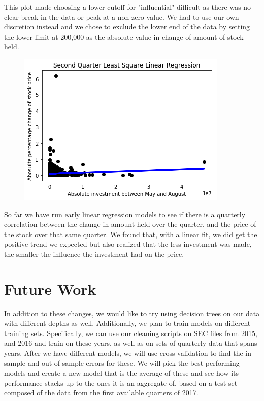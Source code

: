\documentclass{article}
\begin{document}
This plot made choosing a lower cutoff for "influential" difficult as there was no clear break in the data or peak at a non-zero value. We had to use our own discretion instead and we chose to exclude the lower end of the data by setting the lower limit at 200,000 as the absolute value in change of amount of stock held. \\
\begin{figure}[H]
\includegraphics{2.png}
\end{figure}
So far we have run early linear regression models to see if there is a quarterly correlation between the change in amount held over the quarter, and the price of the stock over that same quarter. We found that, with a linear fit, we did get the positive trend we expected but also realized that the less investment was made, the smaller the influence the investment had on the price. 




\section*{Future Work}

In addition to these changes, we would like to try using decision trees on our data with different depths as well. Additionally, we plan to train models on different training sets. Specifically, we can use our cleaning scripts on SEC files from 2015, and 2016 and train on these years, as well as on sets of quarterly data that spans years. After we have different models, we will use cross validation to find the in-sample and out-of-sample errors for these. We will pick the best performing models and create a new model that is the average of these and see how its performance stacks up to the ones it is an aggregate of, based on a test set composed of the data from the first available quarters of 2017.
\end{document}
